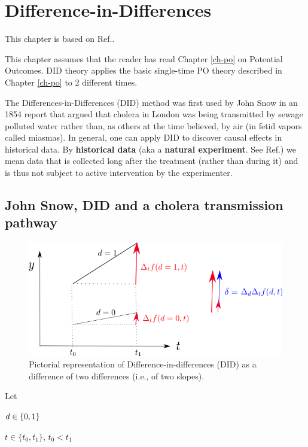 \chapter{Difference-in-Differences}
\label{ch-did}

This chapter is based on
Ref.\cite{book-mixtape}.

This chapter assumes that the
reader has read Chapter \ref{ch-po}
on Potential Outcomes.
DID theory 
applies the basic single-time
PO theory described in Chapter \ref{ch-po}
to 2 different times.


The Differences-in-Differences (DID)
method was first used by John Snow
in an 1854 report that
argued that 
cholera in London
was being transmitted 
by sewage polluted water
rather than, as others
at the time believed, by air (in fetid vapors
called miasmas).
In general, one can
apply DID to discover 
causal effects in historical data.
By {\bf historical data} (aka a {\bf natural
experiment}. See Ref.\cite{wiki-nat-exp})
we mean data that is collected long
after the treatment (rather than during it)
 and is thus
not  subject to 
active intervention
by the experimenter. 



\section{John Snow, DID  
and a cholera
transmission pathway}


\begin{figure}[h!]
\centering
\includegraphics[width=5in]
{did/dif-dif.png}
\caption{Pictorial representation of
 Difference-in-differences (DID) as a difference
of two differences (i.e., of two slopes).} 
\label{fig-dif-dif}
\end{figure}

Let

$d\in \{0,1\}$

$t\in \{t_0, t_1\}$, $t_0< t_1$

